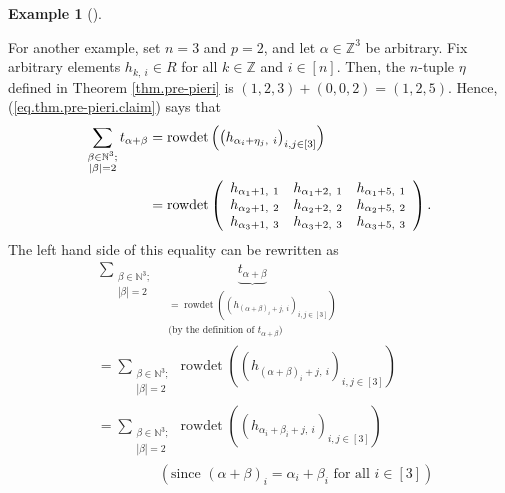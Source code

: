 \documentclass[numbers=enddot,12pt,final,onecolumn,notitlepage,english]{scrartcl}%
\theoremstyle{definition}
\newtheorem{exam}[theo]{Example}
\newenvironment{example}[1][]
{\begin{exam}[#1]\begin{leftbar}}
{\end{leftbar}\end{exam}}
\let\sumnonlimits\sum
\renewcommand{\sum}{\sumnonlimits\limits}
\newenvironment{verlong}{}{}
\begin{document}
\begin{verlong}
\begin{example}
For another example, set $n=3$ and $p=2$, and let $\alpha\in\mathbb{Z}^{3}$ be
arbitrary. Fix arbitrary elements $h_{k,\ i}\in R$ for all $k\in\mathbb{Z}$
and $i\in\left[  n\right]  $. Then, the $n$-tuple $\eta$ defined in Theorem
\ref{thm.pre-pieri} is $\left(  1,2,3\right)  +\left(  0,0,2\right)  =\left(
1,2,5\right)  $. Hence, (\ref{eq.thm.pre-pieri.claim}) says that%
\begin{align*}
\sum_{\substack{\beta\in\mathbb{N}^{3};\\\left\vert \beta\right\vert
=2}}t_{\alpha+\beta}  &  =\operatorname*{rowdet}\left(  \left(  h_{\alpha
_{i}+\eta_{j},\ i}\right)  _{i,j\in\left[  3\right]  }\right) \\
&  =\operatorname*{rowdet}\left(
\begin{array}
[c]{ccc}%
h_{\alpha_{1}+1,\ 1} & h_{\alpha_{1}+2,\ 1} & h_{\alpha_{1}+5,\ 1}\\
h_{\alpha_{2}+1,\ 2} & h_{\alpha_{2}+2,\ 2} & h_{\alpha_{2}+5,\ 2}\\
h_{\alpha_{3}+1,\ 3} & h_{\alpha_{3}+2,\ 3} & h_{\alpha_{3}+5,\ 3}%
\end{array}
\right)  .
\end{align*}
The left hand side of this equality can be rewritten as%
\begin{align*}
&  \sum_{\substack{\beta\in\mathbb{N}^{3};\\\left\vert \beta\right\vert
=2}}\ \ \underbrace{t_{\alpha+\beta}}_{\substack{=\operatorname*{rowdet}%
\left(  \left(  h_{\left(  \alpha+\beta\right)  _{i}+j,\ i}\right)
_{i,j\in\left[  3\right]  }\right)  \\\text{(by the definition of }%
t_{\alpha+\beta}\text{)}}}\\
&  =\sum_{\substack{\beta\in\mathbb{N}^{3};\\\left\vert \beta\right\vert
=2}}\operatorname*{rowdet}\left(  \left(  h_{\left(  \alpha+\beta\right)
_{i}+j,\ i}\right)  _{i,j\in\left[  3\right]  }\right) \\
&  =\sum_{\substack{\beta\in\mathbb{N}^{3};\\\left\vert \beta\right\vert
=2}}\operatorname*{rowdet}\left(  \left(  h_{\alpha_{i}+\beta_{i}%
+j,\ i}\right)  _{i,j\in\left[  3\right]  }\right) \\
&  \ \ \ \ \ \ \ \ \ \ \ \ \ \ \ \ \ \ \ \ \left(  \text{since }\left(
\alpha+\beta\right)  _{i}=\alpha_{i}+\beta_{i}\text{ for all }i\in\left[
3\right]  \right) \\

\end{align*}
\end{example}
\end{verlong}
\end{document}
